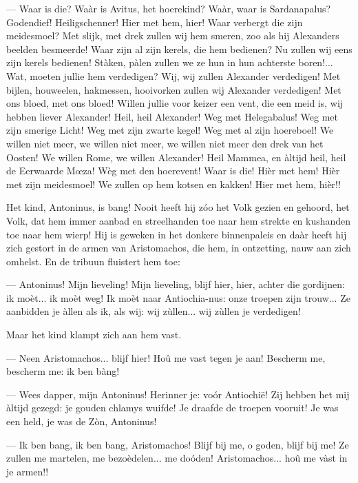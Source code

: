 \documentclass[a4paper, 12pt, oneside, dutch]{article}
\begin{document}
--- Waar is die? Waàr is Avitus, het hoerekind? Waàr, waar is Sardanapalus? Godendief! Heiligschenner! Hier met hem, hier! Waar verbergt die zijn meidesmoel? Met slijk, met drek zullen wij hem smeren, zoo als hij Alexanders beelden besmeerde! Waar zijn al zijn kerels, die hem bedienen? Nu zullen wij eens zijn kerels bedienen! Stàken, pàlen zullen we ze hun in hun achterste boren!... Wat, moeten jullie hem verdedigen? Wij, wij zullen Alexander verdedigen! Met bijlen, houweelen, hakmessen, hooivorken zullen wij Alexander verdedigen! Met ons bloed, met ons bloed! Willen jullie voor keizer een vent, die een meid is, wij hebben liever Alexander! Heil, heil Alexander! Weg met Helegabalus! Weg met zijn smerige Licht! Weg met zijn zwarte kegel! Weg met al zijn hoereboel! We willen niet meer, we willen niet meer, we willen niet meer den drek van het Oosten! We willen Rome, we willen Alexander! Heil Mammea, en àltijd heil, heil de Eerwaarde Mœza! Wèg met den hoerevent! Waar is die! Hièr met hem! Hièr met zijn meidesmoel! We zullen op hem kotsen en kakken! Hier met hem, hièr!!

Het kind, Antoninus, is bang! Nooit heeft hij zóo het Volk gezien en gehoord, het Volk, dat hem immer aanbad en streelhanden toe naar hem strekte en kushanden toe naar hem wierp! Hij is geweken in het donkere binnenpaleis en daàr heeft hij zich gestort in de armen van Aristomachos, die hem, in ontzetting, nauw aan zich omhelst. En de tribuun fluistert hem toe:

--- Antoninus! Mijn lieveling! Mijn lieveling, blijf hier, hier, achter die gordijnen: ik moèt... ik moèt weg! Ik moèt naar Antiochia-nus: onze troepen zijn trouw... Ze aanbidden je àllen als ik, als wij: wij zùllen... wij zùllen je verdedigen!

Maar het kind klampt zich aan hem vast.

--- Neen Aristomachos... blijf hier! Hoû me vast tegen je aan! Bescherm me, bescherm me: ik ben bàng!

--- Wees dapper, mijn Antoninus! Herinner je: voór Antiochië! Zij hebben het mij àltijd gezegd: je gouden chlamys wuifde! Je draafde de troepen vooruit! Je was een held, je was de Zòn, Antoninus!

--- Ik ben bang, ik ben bang, Aristomachos! Blijf bij me, o goden, blijf bij me! Ze zullen me martelen, me bezoèdelen... me doóden! Aristomachos... hoû me vàst in je armen!!
\end{document}
